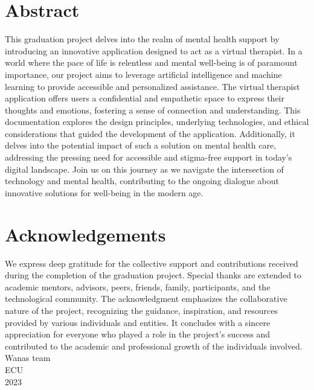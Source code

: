 \documentclass[11pt]{report}
\begin{document}
    \maketitle

\chapter*{Abstract}
This graduation project delves into the realm of mental health support by introducing an innovative application designed to act as a virtual therapist. In a world where the pace of life is relentless and mental well-being is of paramount importance, our project aims to leverage artificial intelligence and machine learning to provide accessible and personalized assistance. The virtual therapist application offers users a confidential and empathetic space to express their thoughts and emotions, fostering a sense of connection and understanding. This documentation explores the design principles, underlying technologies, and ethical considerations that guided the development of the application. Additionally, it delves into the potential impact of such a solution on mental health care, addressing the pressing need for accessible and stigma-free support in today's digital landscape. Join us on this journey as we navigate the intersection of technology and mental health, contributing to the ongoing dialogue about innovative solutions for well-being in the modern age.

\chapter*{Acknowledgements}
We express deep gratitude for the collective support and contributions received during the completion of the graduation project. Special thanks are extended to academic mentors, advisors, peers, friends, family, participants, and the technological community. The acknowledgment emphasizes the collaborative nature of the project, recognizing the guidance, inspiration, and resources provided by various individuals and entities. It concludes with a sincere appreciation for everyone who played a role in the project's success and contributed to the academic and professional growth of the individuals involved.
Wanas team\\
ECU\\
2023
\tableofcontents 
\end{document}
